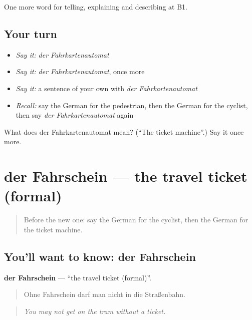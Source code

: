 \begin{grammarlens}[title={What you've built}]
One more word for telling, explaining and describing at B1.
\end{grammarlens}

\subsection*{Your turn}
\begin{itemize}
\raggedright
  \item \emph{Say it:} \emph{der Fahrkartenautomat}
  \item \emph{Say it:} \emph{der Fahrkartenautomat}, once more
  \item \emph{Say it:} a sentence of your own with \emph{der Fahrkartenautomat}
  \item \emph{Recall:} say the German for the pedestrian, then the German for the cyclist, then say \emph{der Fahrkartenautomat} again
\end{itemize}

\begin{tcolorbox}[breakable,colback=teal!4,colframe=teal!35!black,title={Before you move on}]
What does der Fahrkartenautomat mean? (\textquotedblleft{}The ticket machine\textquotedblright{}.) Say it once more.
\end{tcolorbox}
\section[der Fahrschein]{der Fahrschein — the travel ticket (formal)}

\label{lesson:GE-C411-fahrschein}



\begin{quote}
Before the new one: say the German for the cyclist, then the German for the ticket machine.
\end{quote}

\subsection*{You'll want to know: der Fahrschein}
\textbf{der Fahrschein} — \textquotedblleft{}the travel ticket (formal)\textquotedblright{}.

\begin{quote}
Ohne Fahrschein darf man nicht in die Straßenbahn.
\end{quote}

\begin{quote}
\emph{You may not get on the tram without a ticket.}
\end{quote}


